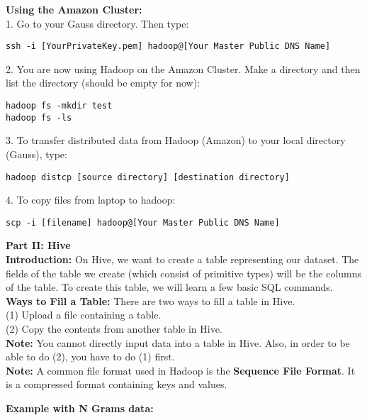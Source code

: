 \documentclass[12pt]{article}
\begin{document}
{\bf Using the Amazon Cluster:} \\

1. Go to your Gauss directory. Then type: 
\begin{verbatim}
ssh -i [YourPrivateKey.pem] hadoop@[Your Master Public DNS Name] 
\end{verbatim}
\vspace{4 mm}
2. You are now using Hadoop on the Amazon Cluster. Make a directory and then list the directory (should be empty for now): 
\begin{verbatim}
hadoop fs -mkdir test
hadoop fs -ls
\end{verbatim}
\vspace{4 mm}
3. To transfer distributed data from Hadoop (Amazon) to your local directory (Gauss), type: \\
\begin{verbatim}
hadoop distcp [source directory] [destination directory]
\end{verbatim}
\vspace{4 mm}
4. To copy files from laptop to hadoop:
\begin{verbatim}
scp -i [filename] hadoop@[Your Master Public DNS Name]
\end{verbatim}
\vspace{10 mm}
{\bf Part II: Hive} \\

{\bf Introduction:} On Hive, we want to create a table representing our dataset. The fields of the table we create (which consist of primitive types) will be the columns of the table. To create this table, we will learn a few basic SQL commands. \\

{\bf Ways to Fill a Table:} There are two ways to fill a table in Hive. \\

(1) Upload a file containing a table. \\
(2) Copy the contents from another table in Hive. \\

{\bf Note:} You cannot directly input data into a table in Hive. Also, in order to be able to do (2), you have to do (1) first. \\

{\bf Note:} A common file format used in Hadoop is the {\bf Sequence File Format}. It is a compressed format containing keys and values. 
\newpage

{\bf Example with N Grams data:} \\
\end{document}
